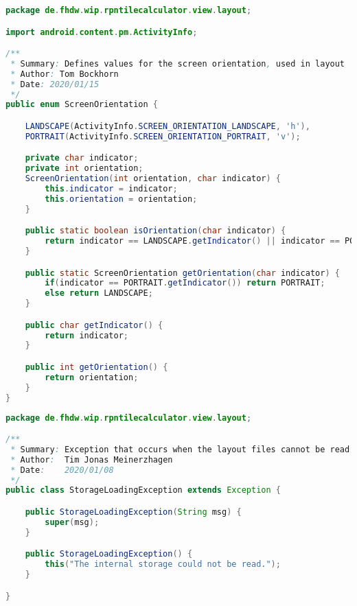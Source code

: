 \begin{lstlisting}[caption=ScreenOrientation,label=list:ScreenOrientation,language=Java]
package de.fhdw.wip.rpntilecalculator.view.layout;

import android.content.pm.ActivityInfo;

/**
 * Summary: Defines values for the screen orientation, used in layout
 * Author: Tom Bockhorn
 * Date: 2020/01/15
 */
public enum ScreenOrientation {

    LANDSCAPE(ActivityInfo.SCREEN_ORIENTATION_LANDSCAPE, 'h'),
    PORTRAIT(ActivityInfo.SCREEN_ORIENTATION_PORTRAIT, 'v');

    private char indicator;
    private int orientation;
    ScreenOrientation(int orientation, char indicator) {
        this.indicator = indicator;
        this.orientation = orientation;
    }

    public static boolean isOrientation(char indicator) {
        return indicator == LANDSCAPE.getIndicator() || indicator == PORTRAIT.getIndicator();
    }

    public static ScreenOrientation getOrientation(char indicator) {
        if(indicator == PORTRAIT.getIndicator()) return PORTRAIT;
        else return LANDSCAPE;
    }

    public char getIndicator() {
        return indicator;
    }

    public int getOrientation() {
        return orientation;
    }
}
\end{lstlisting}    

\begin{lstlisting}[caption=StorageLoadingException,label=list:StorageLoadingException,language=Java]
package de.fhdw.wip.rpntilecalculator.view.layout;

/**
 * Summary: Exception that occurs when the layout files cannot be read
 * Author:  Tim Jonas Meinerzhagen
 * Date:    2020/01/08
 */
public class StorageLoadingException extends Exception {

    public StorageLoadingException(String msg) {
        super(msg);
    }

    public StorageLoadingException() {
        this("The internal storage could not be read.");
    }

}
\end{lstlisting}    

